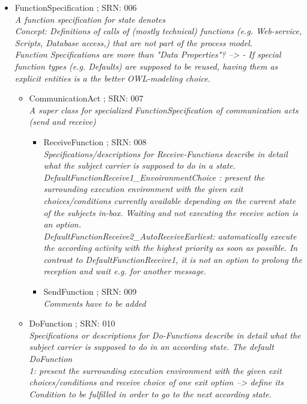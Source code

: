 \begin{itemize}
\begin{itemize}
\begin{itemize}
\begin{itemize}
		\end{itemize}
		\item FunctionSpecification ; SRN: 006 \\ \textit{A function specification for state denotes \\ 
			Concept: Definitions of calls of (mostly technical) functions (e.g. Web-service, Scripts, Database access,) that are not part of the process model.\\
			Function Specifications are more than "Data Properties"? --> - If special function types (e.g. Defaults) are supposed to be reused, having them as explicit entities is a the better OWL-modeling choice.}
		\begin{itemize}
			\item CommunicationAct ; SRN: 007 \\ \textit{A super class for specialized FunctionSpecification of communication acts (send and receive)}
			\begin{itemize}
				\item ReceiveFunction ; SRN: 008 \\ \textit{Specifications/descriptions for Receive-Functions describe in detail what the subject carrier is supposed to do in a state.\\
				DefaultFunctionReceive1\_EnvoironmentChoice : present the surrounding execution environment with the given exit choices/conditions currently available depending on the current state of the subjects in-box. Waiting and not executing the receive action is an option.\\
				DefaultFunctionReceive2\_AutoReceiveEarliest: automatically execute the according activity with the highest priority as soon as possible. In contrast to DefaultFunctionReceive1, it is not an option to prolong the reception and wait e.g. for another message.}
				\item SendFunction ; SRN: 009 \\ \textit{Comments have to be added}
			\end{itemize}
			\item DoFunction ; SRN: 010 \\ \textit{Specifications or descriptions for Do-Functions describe in detail what the subject carrier is supposed to do in an according state.
			The default DoFunction\\ 1: present the surrounding execution environment with the given exit choices/conditions and receive choice of one exit option --> define its Condition to be fulfilled in order to go to the next according state.
}
\end{itemize}
\end{itemize}
\end{itemize}
\end{itemize}
